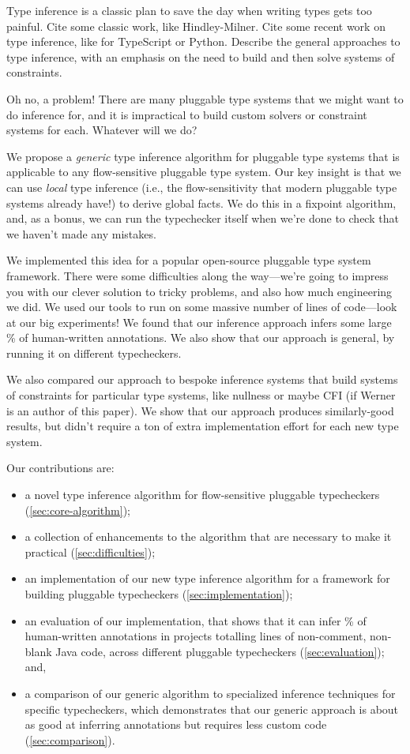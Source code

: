 Type inference is a classic plan to save the day when writing types gets
too painful. Cite some classic work, like Hindley-Milner. Cite some recent
work on type inference, like for TypeScript or Python. Describe the general
approaches to type inference, with an emphasis on the need to build and then
solve systems of constraints.

Oh no, a problem! There are many pluggable type systems that we might want
to do inference for, and it is impractical to build custom solvers or
constraint systems for each. Whatever will we do?

We propose a \emph{generic} type inference algorithm for pluggable type
systems that is applicable to any flow-sensitive pluggable type system.
Our key insight is that we can use \emph{local} type inference (i.e.,
the flow-sensitivity that modern pluggable type systems already have!)
to derive global facts. We do this in a fixpoint algorithm, and, as a bonus,
we can run the typechecker itself when we're done to check that we haven't
made any mistakes.

We implemented this idea for a popular open-source pluggable type system
framework. There were some difficulties along the way---we're going to
impress you with our clever solution to tricky problems, and also how much
engineering we did. We used our tools to run
on some massive number of lines of code---look at our big experiments!
We found that our inference approach infers some large \% of human-written
annotations. We also show that our approach is general, by running it
on  different typecheckers.

We also compared our approach to bespoke inference systems that build
systems of constraints for particular type systems, like nullness or
maybe CFI (if Werner is an author of this paper). We show that our approach
produces similarly-good results, but didn't require a ton of extra
implementation effort for each new type system.

Our contributions are:
\begin{itemize}
\item a novel type inference algorithm for flow-sensitive pluggable
  typecheckers (\cref{sec:core-algorithm});
\item a collection of enhancements to the algorithm that are necessary to
  make it practical (\cref{sec:difficulties});
\item an implementation of our new type inference algorithm for a framework
  for building pluggable typecheckers (\cref{sec:implementation});
\item an evaluation of our implementation, that shows that it can infer
  \% of human-written annotations in  projects totalling
   lines of non-comment, non-blank Java code, across  different
  pluggable typecheckers (\cref{sec:evaluation}); and,
\item a comparison of our generic algorithm to specialized inference
  techniques for specific typecheckers, which demonstrates that our generic
  approach is about as good at inferring annotations but requires less
  custom code (\cref{sec:comparison}).
\end{itemize}
